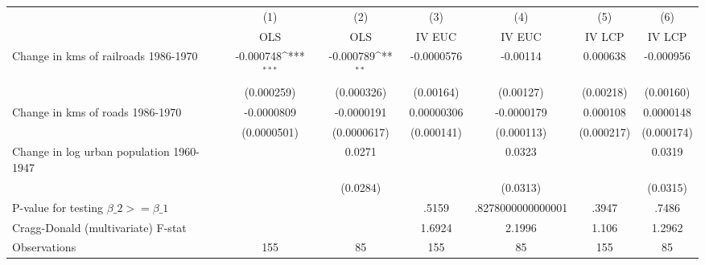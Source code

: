 {
\def\sym#1{\ifmmode^{#1}\else\(^{#1}\)\fi}
\begin{tabular}{l*{6}{c}}
\hline\hline
                &\multicolumn{1}{c}{(1)}&\multicolumn{1}{c}{(2)}&\multicolumn{1}{c}{(3)}&\multicolumn{1}{c}{(4)}&\multicolumn{1}{c}{(5)}&\multicolumn{1}{c}{(6)}\\
                &\multicolumn{1}{c}{OLS}&\multicolumn{1}{c}{OLS}&\multicolumn{1}{c}{IV EUC}&\multicolumn{1}{c}{IV EUC}&\multicolumn{1}{c}{IV LCP}&\multicolumn{1}{c}{IV LCP}\\
\hline
Change in kms of railroads 1986-1970&-0.000748\sym{***}&-0.000789\sym{**} &-0.0000576         & -0.00114         & 0.000638         &-0.000956         \\
                &(0.000259)         &(0.000326)         &(0.00164)         &(0.00127)         &(0.00218)         &(0.00160)         \\
[1em]
Change in kms of roads 1986-1970&-0.0000809         &-0.0000191         &0.00000306         &-0.0000179         & 0.000108         &0.0000148         \\
                &(0.0000501)         &(0.0000617)         &(0.000141)         &(0.000113)         &(0.000217)         &(0.000174)         \\
[1em]
Change in log urban population 1960-1947&                  &   0.0271         &                  &   0.0323         &                  &   0.0319         \\
                &                  & (0.0284)         &                  & (0.0313)         &                  & (0.0315)         \\
\hline
P-value for testing $\beta\_{2} >= \beta\_{1}$&                  &                  &    .5159         &.8278000000000001         &    .3947         &    .7486         \\
Cragg-Donald (multivariate) F-stat&                  &                  &   1.6924         &   2.1996         &    1.106         &   1.2962         \\
Observations    &      155         &       85         &      155         &       85         &      155         &       85         \\
\hline\hline
\end{tabular}
}
